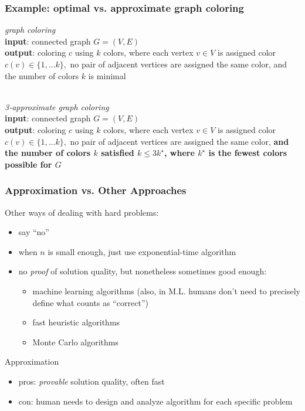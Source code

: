 \documentclass{beamer}
\newcommand{\stanza}{ \\~\ }
\begin{document}
\begin{frame} \frametitle{Example: optimal vs. approximate graph coloring}
\emph{graph coloring} \\
\textbf{input}: connected graph $G=(V,E)$ \\
\textbf{output}: coloring $c$ using $k$ colors, where each vertex $v \in V$ is assigned color
  $c(v) \in \{1, \ldots k\},$ no pair of adjacent vertices are assigned the
  same color, and the number of colors $k$ is minimal
\stanza

\emph{3-approximate graph coloring} \\
\textbf{input}: connected graph $G=(V,E)$ \\
\textbf{output}: coloring $c$ using $k$ colors, where each vertex $v \in V$ is assigned color
  $c(v) \in \{1, \ldots k\},$ no pair of adjacent vertices are assigned the
  same color, \textbf{and the number of colors $k$ satisfied $k \leq 3 k^\star$,
  where $k^\star$ is the fewest colors possible for $G$}
\end{frame}

\begin{frame} \frametitle{Approximation vs. Other Approaches}
Other ways of dealing with hard problems:
\begin{itemize}
  \item say ``no''
  \item when $n$ is small enough, just use exponential-time algorithm
  \item no \emph{proof} of solution quality, but nonetheless sometimes good enough:
    \begin{itemize}
      \item machine learning algorithms (also, in M.L. humans don't need to precisely define what counts as ``correct'')
      \item fast heuristic algorithms
      \item Monte Carlo algorithms
    \end{itemize}
\end{itemize}

Approximation
\begin{itemize}
  \item pros: \emph{provable} solution quality, often fast
  \item con: human needs to design and analyze algorithm for each specific problem
\end{itemize}
\end{frame}
\end{document}
